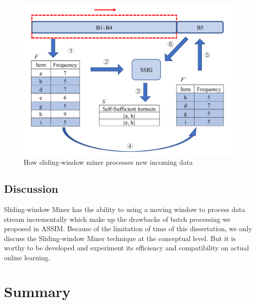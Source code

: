 \begin{figure}[H]
\caption{How sliding-window miner processes new incoming data}
\label{fig:smframe}
\centering
\includegraphics[scale=0.5]{Methodology/frame.png}
\end{figure}

\subsection{Discussion}
Sliding-window Miner has the ability to using a moving window to process data stream incrementally which make up the drawbacks of batch processing we proposed in ASSIM. Because of the limitation of time of this dissertation, we only discuss the Sliding-window Miner technique at the conceptual level. But it is worthy to be developed and experiment its efficiency and compatibility on actual online learning.

\section{Summary}

